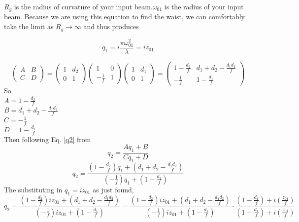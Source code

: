 \documentclass[11pt, letterpaper]{article}
\begin{document}
\begin{enumerate}
\begin{enumerate}
$R_{g}$ is the radius of curvature of your input beam.$\omega_{01}$ is the radius of your input beam.
Because we are using this equation to find the waist, we can comfortably take the limit as $R_g\to \infty$ and thus produces

$$q_1 = i\frac{\pi \omega_{01}^2}{\lambda}=iz_{01}$$


$$\begin{pmatrix} A & B \\ C & D \end{pmatrix} = \begin{pmatrix} 1 & d_2 \\ 0 & 1 \end{pmatrix}\begin{pmatrix} 1 & 0 \\ -\frac{1}{f} & 1 \end{pmatrix} \begin{pmatrix} 1 & d_1 \\ 0 & 1 \end{pmatrix}=\begin{pmatrix} 1 - \frac{d_2}{f} & d_1 + d_2 - \frac{d_1 d_2}{f} \\ -\frac{1}{f} & 1 - \frac{d_1}{f} \end{pmatrix}$$
So\\ $A=1 - \frac{d_2}{f}$\\
$B =d_1 + d_2 - \frac{d_1 d_2}{f}$\\
$C=-\frac{1}{f}$\\
$D=1 - \frac{d_1}{f} $\\
Then following Eq. \ref{q2} from \cite{Osche}
\begin{equation}\label{q2}
q_2 = \frac{A q_1 + B}{C q_1 + D}
\end{equation}
$$q_2=\frac{\left(1 - \frac{d_2}{f}\right)q_1 + \left(d_1 + d_2 - \frac{d_1 d_2}{f}\right)}{\left(-\frac{1}{f}\right) q_1 + \left(1 - \frac{d_1}{f}\right)}$$
The substituting in $q_1=iz_{01}$ as just found,
$$q_2=\frac{\left(1 - \frac{d_2}{f}\right)iz_{01} + \left(d_1 + d_2 - \frac{d_1 d_2}{f}\right)}{\left(-\frac{1}{f}\right)iz_{01} + \left(1 - \frac{d_1}{f}\right)}=\frac{\left(1 - \frac{d_2}{f}\right)iz_{01} + \left(d_1 + d_2 - \frac{d_1 d_2}{f}\right)}{\left(-\frac{1}{f}\right)iz_{01} + \left(1 - \frac{d_1}{f}\right)}\cdot\frac{ \left(1 - \frac{d_1}{f}\right)+i\left(\frac{z_{01}}{f}\right)}{\left(1 - \frac{d_1}{f}\right)+i\left(\frac{z_{01}}{f}\right)}$$


\end{enumerate}
\end{enumerate}
\end{document}
